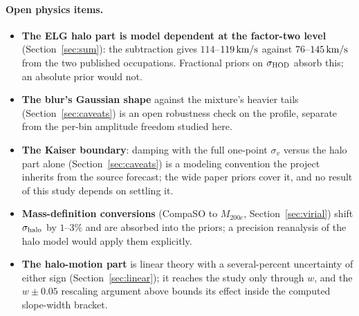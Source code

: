 \documentclass[11pt]{article}
\newcommand{\sv}{\sigma_v}
\newcommand{\shod}{\sigma_{\rm HOD}}
\newcommand{\shalo}{\sigma_{\rm halo}}
\newcommand{\kms}{\,{\rm km/s}}
\begin{document}
\paragraph{Open physics items.}
\begin{itemize}
  \item \textbf{The ELG halo part is model dependent at the
    factor-two level} (Section~\ref{sec:sum}): the subtraction gives
    $114$--$119\kms$ against $76$--$145\kms$ from the two published
    occupations.  Fractional priors on $\shod$ absorb this; an
    absolute prior would not.
  \item \textbf{The blur's Gaussian shape} against the mixture's
    heavier tails (Section~\ref{sec:caveats}) is an open robustness
    check on the profile, separate from the per-bin amplitude freedom
    studied here.
  \item \textbf{The Kaiser boundary}: damping with the full one-point
    $\sv$ versus the halo part alone
    (Section~\ref{sec:caveats}) is a modeling convention the project
    inherits from the source forecast; the wide paper priors cover
    it, and no result of this study depends on settling it.
  \item \textbf{Mass-definition conversions} (CompaSO to $M_{200c}$,
    Section~\ref{sec:virial}) shift $\shalo$ by $1$--$3\%$ and are
    absorbed into the priors; a precision reanalysis of the halo
    model would apply them explicitly.
  \item \textbf{The halo-motion part} is linear theory with a
    several-percent uncertainty of either sign
    (Section~\ref{sec:linear}); it reaches the study only through
    $w$, and the $w \pm 0.05$ rescaling argument above bounds its
    effect inside the computed slope-width bracket.
\end{itemize}
\end{document}
